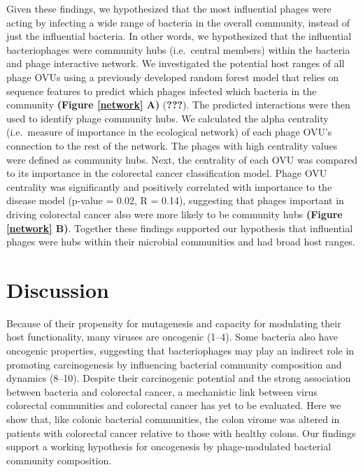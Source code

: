 \documentclass[12pt,]{article}
\begin{document}
Given these findings, we hypothesized that the most influential phages
were acting by infecting a wide range of bacteria in the overall
community, instead of just the influential bacteria. In other words, we
hypothesized that the influential bacteriophages were community hubs
(i.e.~central members) within the bacteria and phage interactive
network. We investigated the potential host ranges of all phage OVUs
using a previously developed random forest model that relies on sequence
features to predict which phages infected which bacteria in the
community \textbf{(Figure \ref{network} A)} ({\textbf{???}}). The
predicted interactions were then used to identify phage community hubs.
We calculated the alpha centrality (i.e.~measure of importance in the
ecological network) of each phage OVU's connection to the rest of the
network. The phages with high centrality values were defined as
community hubs. Next, the centrality of each OVU was compared to its
importance in the colorectal cancer classification model. Phage OVU
centrality was significantly and positively correlated with importance
to the disease model (p-value = 0.02, R = 0.14), suggesting that phages
important in driving colorectal cancer also were more likely to be
community hubs \textbf{(Figure \ref{network} B)}. Together these
findings supported our hypothesis that influential phages were hubs
within their microbial communities and had broad host ranges.

\section{Discussion}\label{discussion}

Because of their propensity for mutagenesis and capacity for modulating
their host functionality, many viruses are oncogenic (1--4). Some
bacteria also have oncogenic properties, suggesting that bacteriophages
may play an indirect role in promoting carcinogenesis by influencing
bacterial community composition and dynamics (8--10). Despite their
carcinogenic potential and the strong association between bacteria and
colorectal cancer, a mechanistic link between virus colorectal
communities and colorectal cancer has yet to be evaluated. Here we show
that, like colonic bacterial communities, the colon virome was altered
in patients with colorectal cancer relative to those with healthy
colons. Our findings support a working hypothesis for oncogenesis by
phage-modulated bacterial community composition.
\end{document}
